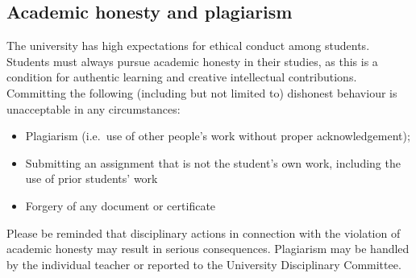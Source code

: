 \documentclass[
  letterpaper,
  DIV=11,
  numbers=noendperiod]{scrartcl}
\begin{document}
\subsection{Academic honesty and
plagiarism}\label{academic-honesty-and-plagiarism}

The university has high expectations for ethical conduct among students.
Students must always pursue academic honesty in their studies, as this
is a condition for authentic learning and creative intellectual
contributions. Committing the following (including but not limited to)
dishonest behaviour is unacceptable in any circumstances:

\begin{itemize}
\item
  Plagiarism (i.e.~use of other people's work without proper
  acknowledgement);
\item
  Submitting an assignment that is not the student's own work, including
  the use of prior students' work
\item
  Forgery of any document or certificate
\end{itemize}

Please be reminded that disciplinary actions in connection with the
violation of academic honesty may result in serious consequences.
Plagiarism may be handled by the individual teacher or reported to the
University Disciplinary Committee.
\end{document}

